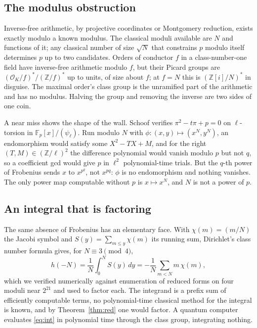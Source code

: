\documentclass[conference]{IEEEtran}
\newcommand{\Z}{\mathbb{Z}}
\begin{document}
\subsection{The modulus obstruction}
Inverse-free arithmetic, by projective coordinates or Montgomery reduction, exists exactly modulo a known modulus. The classical moduli available are $N$ and functions of it; any classical number of size $\sqrt N$ that constrains $p$ modulo itself determines $p$ up to two candidates. Orders of conductor $f$ in a class-number-one field have inverse-free arithmetic modulo $f$, but their Picard groups are $(\mathcal O_K/f)^*/(\Z/f)^*$ up to units, of size about $f$; at $f=N$ this is $(\Z[i]/N)^*$ in disguise. The maximal order's class group is the unramified part of the arithmetic and has no modulus. Halving the group and removing the inverse are two sides of one coin.

A near miss shows the shape of the wall. Schoof verifies $\pi^2-t\pi+p=0$ on $\ell$-torsion in $\mathbb F_p[x]/(\psi_\ell)$. Run modulo $N$ with $\phi:(x,y)\mapsto(x^N,y^N)$, an endomorphism would satisfy some $X^2-TX+M$, and for the right $(T,M)\in(\Z/\ell)^2$ the difference polynomial would vanish modulo $p$ but not $q$, so a coefficient gcd would give $p$ in $\ell^2$ polynomial-time trials. But the $q$-th power of Frobenius sends $x$ to $x^{p^q}$, not $x^{pq}$: $\phi$ is no endomorphism and nothing vanishes. The only power map computable without $p$ is $x\mapsto x^N$, and $N$ is not a power of $p$.

\subsection{An integral that is factoring}
The same absence of Frobenius has an elementary face. With $\chi(m)=(m/N)$ the Jacobi symbol and $S(y)=\sum_{m\le y}\chi(m)$ its running sum, Dirichlet's class number formula gives, for $N\equiv3\pmod4$,
\begin{equation}\label{eq:int}
h(-N)=\frac1N\int_0^N S(y)\,dy=-\frac1N\sum_{m<N}m\,\chi(m),
\end{equation}
which we verified numerically against enumeration of reduced forms on four moduli near $2^{21}$ and used to factor each. The integrand is a prefix sum of efficiently computable terms, no polynomial-time classical method for the integral is known, and by Theorem~\ref{thm:red} one would factor. A quantum computer evaluates \eqref{eq:int} in polynomial time through the class group, integrating nothing.
\end{document}
